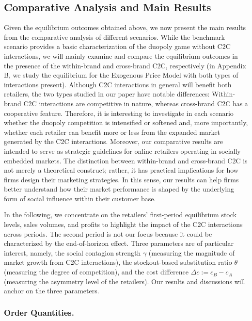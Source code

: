 \documentclass[nonblindrev,copyedit]{informs1}
\begin{document}
\subsection{Comparative Analysis and Main Results}\label{exo:main}

Given the equilibrium outcomes obtained above, we now present the main results from the comparative analysis of different scenarios. While the benchmark scenario provides a basic characterization of the duopoly game without C2C interactions, we will mainly examine and compare the equilibrium outcomes in the presence of the within-brand and cross-brand C2C, respectively (in Appendix B, we study the equilibrium for the Exogenous Price Model with both types of interactions present).
Although C2C interactions in general will benefit both retailers, the two types studied in our paper have notable differences: Within-brand C2C interactions are competitive in nature, whereas cross-brand C2C has a cooperative feature. Therefore, it is interesting to investigate in each scenario whether the duopoly competition is intensified or softened and, more importantly, whether each retailer can benefit more or less from the expanded market generated by the C2C interactions.
Moreover, our comparative results are intended to serve as strategic guidelines for online retailers operating in socially embedded markets. The distinction between within-brand and cross-brand C2C is not merely a theoretical construct; rather, it has practical implications for how firms design their marketing strategies. In this sense, our results can help firms better understand how their market performance is shaped by the underlying form of social influence within their customer base.

In the following, we concentrate on the retailers' first-period equilibrium stock levels, sales volumes, and profits to highlight the impact of the C2C interactions across periods. The second period is not our focus because it could be characterized by the end-of-horizon effect. Three parameters are of particular interest, namely, the social contagion strength $\gamma$ (measuring the magnitude of market growth from C2C interactions), the stockout-based substitution ratio $\theta$ (measuring the degree of competition), and the cost difference $\Delta c:= c_B-c_A$ (measuring the asymmetry level of the retailers). Our results and discussions will anchor on the three parameters.

\subsubsection{Order Quantities.}
\end{document}
